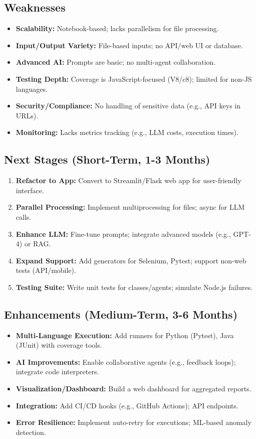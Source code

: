 \documentclass{article}
\begin{document}
\subsection{Weaknesses}
\begin{itemize}
    \item \textbf{Scalability:} Notebook-based; lacks parallelism for file processing.
    \item \textbf{Input/Output Variety:} File-based inputs; no API/web UI or database.
    \item \textbf{Advanced AI:} Prompts are basic; no multi-agent collaboration.
    \item \textbf{Testing Depth:} Coverage is JavaScript-focused (V8/c8); limited for non-JS languages.
    \item \textbf{Security/Compliance:} No handling of sensitive data (e.g., API keys in URLs).
    \item \textbf{Monitoring:} Lacks metrics tracking (e.g., LLM costs, execution times).
\end{itemize}

\subsection{Next Stages (Short-Term, 1-3 Months)}
\begin{enumerate}
    \item \textbf{Refactor to App:} Convert to Streamlit/Flask web app for user-friendly interface.
    \item \textbf{Parallel Processing:} Implement multiprocessing for files; async for LLM calls.
    \item \textbf{Enhance LLM:} Fine-tune prompts; integrate advanced models (e.g., GPT-4) or RAG.
    \item \textbf{Expand Support:} Add generators for Selenium, Pytest; support non-web tests (API/mobile).
    \item \textbf{Testing Suite:} Write unit tests for classes/agents; simulate Node.js failures.
\end{enumerate}

\subsection{Enhancements (Medium-Term, 3-6 Months)}
\begin{itemize}
    \item \textbf{Multi-Language Execution:} Add runners for Python (Pytest), Java (JUnit) with coverage tools.
    \item \textbf{AI Improvements:} Enable collaborative agents (e.g., feedback loops); integrate code interpreters.
    \item \textbf{Visualization/Dashboard:} Build a web dashboard for aggregated reports.
    \item \textbf{Integration:} Add CI/CD hooks (e.g., GitHub Actions); API endpoints.
    \item \textbf{Error Resilience:} Implement auto-retry for executions; ML-based anomaly detection.
\end{itemize}
\end{document}
